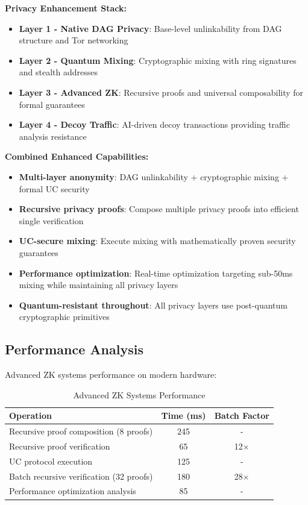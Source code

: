 \documentclass[12pt,a4paper]{article}
\begin{document}
\textbf{Privacy Enhancement Stack:}
\begin{itemize}
\item \textbf{Layer 1 - Native DAG Privacy}: Base-level unlinkability from DAG structure and Tor networking
\item \textbf{Layer 2 - Quantum Mixing}: Cryptographic mixing with ring signatures and stealth addresses  
\item \textbf{Layer 3 - Advanced ZK}: Recursive proofs and universal composability for formal guarantees
\item \textbf{Layer 4 - Decoy Traffic}: AI-driven decoy transactions providing traffic analysis resistance
\end{itemize}

\textbf{Combined Enhanced Capabilities:}
\begin{itemize}
\item \textbf{Multi-layer anonymity}: DAG unlinkability + cryptographic mixing + formal UC security
\item \textbf{Recursive privacy proofs}: Compose multiple privacy proofs into efficient single verification
\item \textbf{UC-secure mixing}: Execute mixing with mathematically proven security guarantees
\item \textbf{Performance optimization}: Real-time optimization targeting sub-50ms mixing while maintaining all privacy layers
\item \textbf{Quantum-resistant throughout}: All privacy layers use post-quantum cryptographic primitives
\end{itemize}

\subsection{Performance Analysis}

Advanced ZK systems performance on modern hardware:

\begin{table}[h]
\centering
\begin{tabular}{lcc}
\toprule
Operation & Time (ms) & Batch Factor \\
\midrule
Recursive proof composition (8 proofs) & 245 & - \\
Recursive proof verification & 65 & 12× \\
UC protocol execution & 125 & - \\
Batch recursive verification (32 proofs) & 180 & 28× \\
Performance optimization analysis & 85 & - \\
\bottomrule
\end{tabular}
\caption{Advanced ZK Systems Performance}
\end{table}
\end{document}
